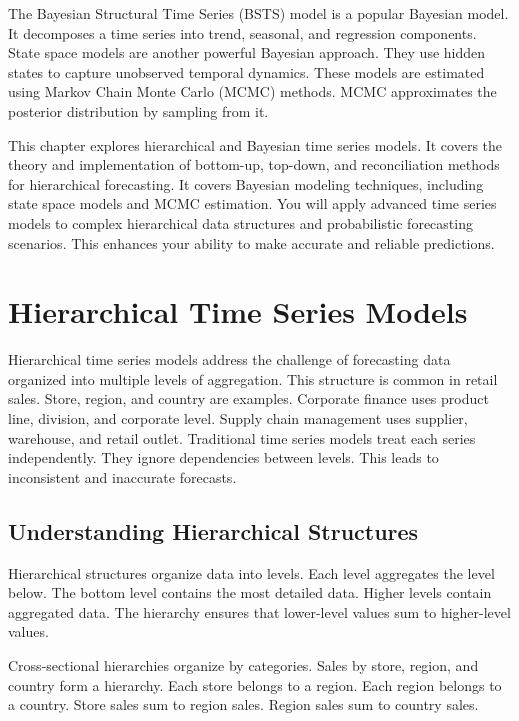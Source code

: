 The Bayesian Structural Time Series (BSTS) model is a popular Bayesian model. It decomposes a time series into trend, seasonal, and regression components. State space models are another powerful Bayesian approach. They use hidden states to capture unobserved temporal dynamics. These models are estimated using Markov Chain Monte Carlo (MCMC) methods. MCMC approximates the posterior distribution by sampling from it.

This chapter explores hierarchical and Bayesian time series models. It covers the theory and implementation of bottom-up, top-down, and reconciliation methods for hierarchical forecasting. It covers Bayesian modeling techniques, including state space models and MCMC estimation. You will apply advanced time series models to complex hierarchical data structures and probabilistic forecasting scenarios. This enhances your ability to make accurate and reliable predictions.



\section{Hierarchical Time Series Models}

Hierarchical time series models address the challenge of forecasting data organized into multiple levels of aggregation. This structure is common in retail sales. Store, region, and country are examples. Corporate finance uses product line, division, and corporate level. Supply chain management uses supplier, warehouse, and retail outlet. Traditional time series models treat each series independently. They ignore dependencies between levels. This leads to inconsistent and inaccurate forecasts.

\subsection{Understanding Hierarchical Structures}

Hierarchical structures organize data into levels. Each level aggregates the level below. The bottom level contains the most detailed data. Higher levels contain aggregated data. The hierarchy ensures that lower-level values sum to higher-level values.

Cross-sectional hierarchies organize by categories. Sales by store, region, and country form a hierarchy. Each store belongs to a region. Each region belongs to a country. Store sales sum to region sales. Region sales sum to country sales.

